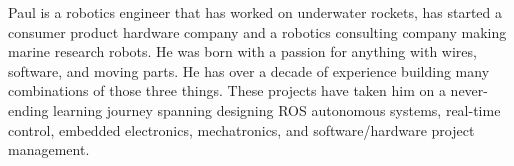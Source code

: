 

\begin{cvparagraph}

Paul is a robotics engineer that has worked on underwater rockets, has started a
consumer product hardware company and a robotics consulting company making marine
research robots. He was born with a passion for anything with wires, software,
and moving parts. He has over a decade of experience building many combinations
of those three things. These projects have taken him on a never-ending learning
journey spanning designing ROS autonomous systems, real-time control, embedded
electronics, mechatronics, and software/hardware project management.
\end{cvparagraph}

